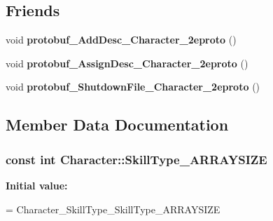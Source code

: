 \subsection*{Friends}
\begin{DoxyCompactItemize}
\item 
\hypertarget{classproto_1_1_character_adef05d207947d9b35b104f4d265cb814}{}void {\bfseries protobuf\+\_\+\+Add\+Desc\+\_\+\+Character\+\_\+2eproto} ()\label{classproto_1_1_character_adef05d207947d9b35b104f4d265cb814}

\item 
\hypertarget{classproto_1_1_character_a60f31d05ed7be3be9b60eec3dce13a63}{}void {\bfseries protobuf\+\_\+\+Assign\+Desc\+\_\+\+Character\+\_\+2eproto} ()\label{classproto_1_1_character_a60f31d05ed7be3be9b60eec3dce13a63}

\item 
\hypertarget{classproto_1_1_character_af5b2da6541a81a0d17644f512d753edc}{}void {\bfseries protobuf\+\_\+\+Shutdown\+File\+\_\+\+Character\+\_\+2eproto} ()\label{classproto_1_1_character_af5b2da6541a81a0d17644f512d753edc}

\end{DoxyCompactItemize}


\subsection{Member Data Documentation}
\hypertarget{classproto_1_1_character_afc9adf4655c55ee1033853a3f93c1ebc}{}
\subsubsection[{Skill\+Type\+\_\+\+A\+R\+R\+A\+Y\+S\+I\+Z\+E}]{\setlength{\rightskip}{0pt plus 5cm}const int Character\+::\+Skill\+Type\+\_\+\+A\+R\+R\+A\+Y\+S\+I\+Z\+E\hspace{0.3cm}{\ttfamily [static]}}\label{classproto_1_1_character_afc9adf4655c55ee1033853a3f93c1ebc}
{\bfseries Initial value\+:}
\begin{DoxyCode}
=
    Character\_SkillType\_SkillType\_ARRAYSIZE
\end{DoxyCode}
\hypertarget{classproto_1_1_character_aaa2541858654ab5995c7fc89dbd8b7a4}{}
